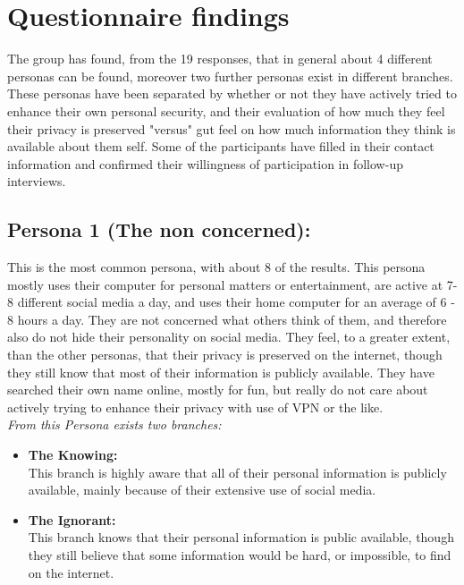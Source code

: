 \section{Questionnaire findings}
The group has found, from the 19 responses, that in general about 4 different personas can be found, moreover two further personas exist in different branches. These personas have been separated by whether or not they have actively tried to enhance their own personal security, and their evaluation of how much they feel their privacy is preserved "versus" gut feel on how much information they think is available about them self. Some of the participants have filled in their contact information and confirmed their willingness of participation in follow-up interviews.

\subsection{Persona 1 (The non concerned):}
This is the most common persona, with about 8 of the results.
This persona mostly uses their computer for personal matters or entertainment, are active at 7-8 different social media a day,
and uses their home computer for an average of 6 - 8 hours a day.
They are not concerned what others think of them, and therefore also do not hide their personality on social media.
They feel, to a greater extent, than the other personas, that their privacy is preserved on the internet, though they still know that most of their information is publicly available.
They have searched their own name online, mostly for fun, but really do not care about actively trying to enhance their privacy with use of VPN or the like.\\

\textit{From this Persona exists two branches:}
\begin{itemize}
    \item 
    \textbf{The Knowing:}\\
    This branch is highly aware that all of their personal information is publicly available, mainly because of their extensive use of social media.
    \item 
    \textbf{The Ignorant:}\\
    This branch knows that their personal information is public available, though they still believe that some information would be hard, or impossible, to find on the internet.
\end{itemize}

